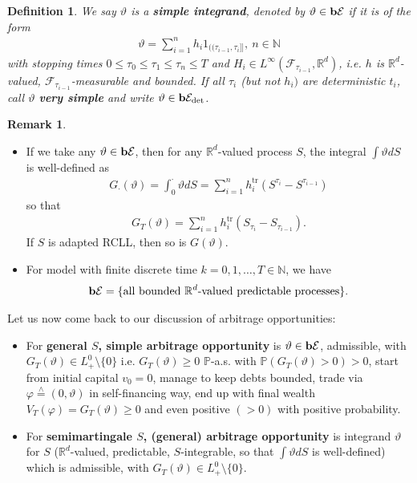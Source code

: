\documentclass[12pt,a4paper, twoside]{article}
\newtheorem{defn}{Definition}[section]
\theoremstyle{definition}
\newtheorem{rem}{Remark}[section]
\newcommand{\PP}{\mathbb{P}} %
\newcommand{\teq}{\overset{\wedge}{=}}
\newcommand{\simple}{\textbf{\text{b}}\mathcal{E}}
\newcommand{\verysimple}{\textbf{\text{b}}\mathcal{E}_{\text{det}}}
\begin{document}
\begin{defn} We say $\vartheta$ is a \textbf{simple integrand}, denoted by $\vartheta \in \simple$ if it is of the form 
\begin{align*}
\vartheta = \sum_{i=1}^n h_i 1_{(\!( \tau_{i-1}, \tau_i ]\!]}, \ n \in \mathbb{N}
\end{align*}
with stopping times $0 \leq \tau_0 \leq \tau_1 \leq \tau_n \leq T$ and $H_i \in L^\infty ( \mathcal{F}_{\tau_{i-1}}, \mathbb{R}^d)$, i.e. $h$ is $\mathbb{R}^d$-valued, $ \mathcal{F}_{\tau_{i-1}}$-measurable and bounded. If all $\tau_i$ (but not $h_i)$ are deterministic $t_i$, call $\vartheta$ \textbf{very simple} and write $\vartheta \in \verysimple$. 
\end{defn}
\newpage
\begin{rem} \
\begin{itemize}
\item If we take any $\vartheta \in \simple$, then for any $\mathbb{R}^d$-valued process $S$, the integral $ \int \vartheta dS$ is well-defined as 
\begin{align*}
G_\cdot ( \vartheta) = \int_0^\cdot \vartheta dS = \sum_{i=1}^n h_i^{\text{tr}}(S^{\tau_i}- S^{\tau_{i-1}}) 
\end{align*}
so that 
\begin{align*}
G_T( \vartheta) = \sum_{i=1}^n h_i^{\text{tr}} (S_{\tau_i}-S_{\tau_{i-1}}).
\end{align*}
If $S$ is adapted RCLL, then so is $G( \vartheta)$. 
\item For model with finite discrete time $k=0,1, \dots , T \in \mathbb{N}$, we have
\begin{align*}
\simple = \{\text{all bounded $\mathbb{R}^d$-valued predictable processes}\}.
\end{align*}
\end{itemize}
\end{rem}
Let us now come back to our discussion of arbitrage opportunities:
\begin{itemize}
\item For \textbf{general $S$, simple arbitrage opportunity} is $\vartheta \in \simple$, admissible, with $G_T( \vartheta) \in L_+^0\setminus \{0 \}$ i.e. $G_T( \vartheta) \geq 0$ $\PP$-a.s. with $\PP( G_T( \vartheta) >0)>0$, start from initial capital $v_0=0$, manage to keep debts bounded, trade via $\varphi \teq (0, \vartheta)$ in self-financing way, end up with final wealth $V_T( \varphi) = G_T( \vartheta) \geq 0$ and even positive $(>0)$ with positive probability. 
\item For \textbf{semimartingale $S$, (general) arbitrage opportunity} is integrand $\vartheta$ for $S$ ($\mathbb{R}^d$-valued, predictable, $S$-integrable, so that $\int \vartheta dS$ is well-defined) which is admissible, with $G_T( \vartheta) \in L_+^0 \setminus \{0\}$. 
\end{itemize}
\end{document}
